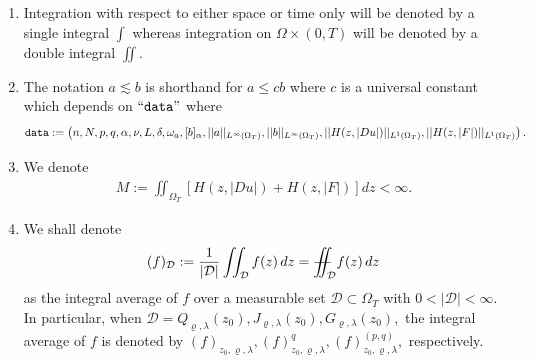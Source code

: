 \documentclass[11pt,oneside, english,reqno,twoside a4paper]{amsart}
\theoremstyle{definition}
\numberwithin{theorem}{section}
\numberwithin{equation}{section}
\newcommand{\mcq}{{\mathcal{Q}}}
\newcommand{\RR}{\mathbb{R}}
\newcommand{\iintss}{{\int\hspace{-0.28cm}\int}}
\newcommand{ \miints }{{\iintss\hspace{-0.56cm} -\hspace{-0.15cm}-}}
\newcommand{\miint}[1]{{\miints_{\hspace{-0.13cm}#1}}}
\begin{document}
\begin{enumerate}[label=(\roman*),series=theoremconditions]
\item\label{not7} Integration with respect to either space or time only will be denoted by a single integral $\int$ whereas integration on $\Omega\times (0, T)$ will be denoted by a double integral $\iint$. 
	\item\label{not9} The notation $a \lesssim b$ is shorthand for $a\leq c b$ where $c$ is a universal constant which depends on $``\text{\texttt{data}}"$ where 
 \begin{align*}
\text{\texttt{data}}:=\left(n, N, p, q, \alpha, \nu, L, \delta, \omega_a, [b]_{\alpha}, ||a||_{L^{\infty}(\Omega_T)}, ||b||_{L^{\infty}(\Omega_T)}, ||H(z, |D u|)||_{L^1(\Omega_T)}, ||H(z, |F|)||_{L^1(\Omega_T)}\right).
 \end{align*}
 \item \label{M1}
 We denote
 \begin{align*}
     M:=\iint_{\Omega_T} \left[ H(z, |Du|)+H(z, |F|) \right] dz < \infty.
 \end{align*}
 \item \label{integral avarage} We shall denote
 \begin{align*}
     (f)_{\mathcal{D}}:= \frac{1}{|\mathcal{D}|}\iint_{\mathcal{D}} f(z)\, dz= \miint{\mathcal{D}} f(z)\, dz
 \end{align*}
 as the integral average of $f$ over a measurable set $\mathcal{D} \subset \Omega_T$ with $0<|\mathcal{D}|<\infty.$ In particular, when $\mathcal{D}=Q_{\varrho, \lambda}(z_0), J_{\varrho, \lambda}(z_0), G_{\varrho, \lambda}(z_0),$ the integral average of $f$ is denoted by $(f)_{z_0, \varrho, \lambda}, (f)^q_{z_0, \varrho, \lambda}, (f)^{(p,q)}_{z_0, \varrho, \lambda},$ respectively.
\end{enumerate}
\end{document}
